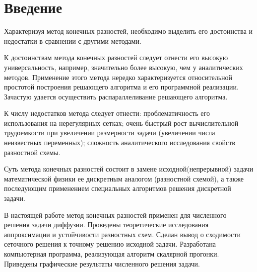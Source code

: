 \section*{Введение}
{
	Характеризуя метод конечных разностей, необходимо выделить его достоинства и недостатки в сравнении с другими методами.

	К достоинствам метода конечных разностей следует отнести его
высокую универсальность, например, значительно более высокую, чем у
аналитических методов. Применение этого метода нередко характеризуется
относительной простотой построения решающего алгоритма и его
программной реализации. Зачастую удается осуществить распараллеливание
решающего алгоритма.

	К числу недостатков метода следует отнести: проблематичность его
использования на нерегулярных сетках; очень быстрый рост вычислительной
трудоемкости при увеличении размерности задачи (увеличении числа
неизвестных переменных); сложность аналитического исследования свойств
разностной схемы.

	Суть метода конечных разностей состоит в замене
исходной(непрерывной) задачи математической физики ее дискретным
аналогом (разностной схемой), а также последующим применением
специальных алгоритмов решения дискретной задачи.

	В настоящей работе метод конечных разностей применен для
численного решения задачи диффузии. Проведены теоретические
исследования аппроксимации и устойчивости разностных схем. Сделан вывод
о сходимости сеточного решения к точному решению исходной задачи.
Разработана компьютерная программа, реализующая алгоритм скалярной
прогонки. Приведены графические результаты численного решения задачи.
}
\newpage

\titleformat{\section}{\large\bfseries}{\thesection}{0.5em}{}
\titlespacing*{\section}{\parindent}{1ex}{1em}
